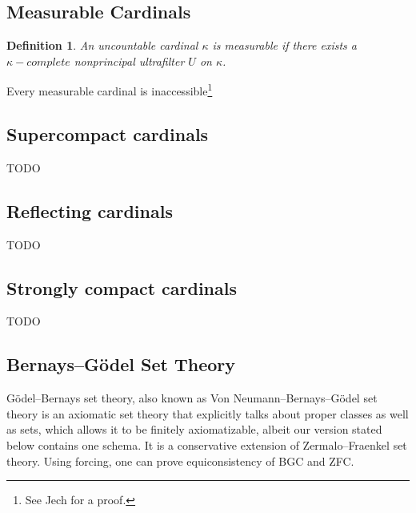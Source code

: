 \documentclass[12pt,a4paper]{article}
\newtheorem{definition}[theorem]{Definition}
\begin{document}
\subsection{Measurable Cardinals}
\begin{definition}
An uncountable cardinal $\kappa$ is measurable if there exists a $\kappa-complete$ nonprincipal ultrafilter $U$ on $\kappa$.
\end{definition}

Every measurable cardinal is inaccessible\footnote{See Jech\cite{Jech} for a proof.}

\subsection{Supercompact cardinals}
TODO

\subsection{Reflecting cardinals}
TODO

\subsection{Strongly compact cardinals}
TODO

\newpage
\subsection{Bernays–G{\"o}del Set Theory}
G{\"o}del–Bernays set theory, also known as Von Neumann–Bernays–G{\"o}del set theory is an axiomatic set theory that 
explicitly talks about proper classes as well as sets, which allows it to be finitely axiomatizable, albeit our version stated below contains one schema. It is a conservative extension of Zermalo–Fraenkel set theory. Using forcing, one can prove equiconsistency of BGC and ZFC.
\newline
 
\end{document}
